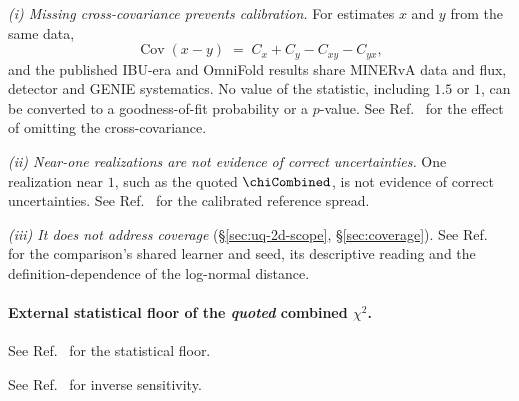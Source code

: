 \emph{(i) Missing cross-covariance prevents calibration.} For estimates $x$ and $y$ from the same data,
\begin{equation}
  \label{eq:diffcov}
  \operatorname{Cov}(x-y) \;=\; C_{x} + C_{y} - C_{xy} - C_{yx},
\end{equation}
and the published IBU-era and OmniFold results share MINERvA data and flux, detector and GENIE systematics. No value of the statistic, including $1.5$ or $1$, can be converted to a goodness-of-fit probability or a $p$-value. See Ref.~\cite{NoteRecords2026} for the effect of omitting the cross-covariance.

\emph{(ii) Near-one realizations are not evidence of correct uncertainties.} One realization near $1$, such as the quoted $\chiCombined$, is not evidence of correct uncertainties. See Ref.~\cite{NoteRecords2026} for the calibrated reference spread.

\emph{(iii) It does not address coverage} (\S\ref{sec:uq-2d-scope}, \S\ref{sec:coverage}). See Ref.~\cite{NoteRecords2026} for the comparison's shared learner and seed, its descriptive reading and the definition-dependence of the log-normal distance.

\paragraph{External statistical floor of the \emph{quoted} combined $\chi^{2}$.} See Ref.~\cite{NoteRecords2026} for the statistical floor.

See Ref.~\cite{NoteRecords2026} for inverse sensitivity. 

